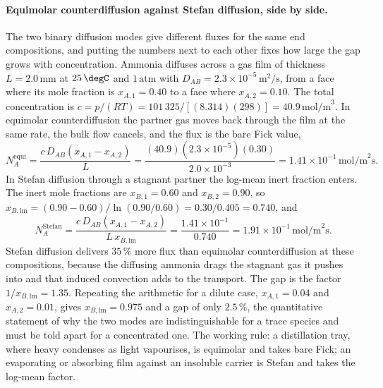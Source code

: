 \paragraph{Equimolar counterdiffusion against Stefan diffusion, side by
side.} The two binary diffusion modes give different fluxes for the same
end compositions, and putting the numbers next to each other fixes how
large the gap grows with concentration. Ammonia diffuses across a gas film
of thickness $L = 2.0\,\si{\milli\meter}$ at $25\,\degC$ and $1\,\text{atm}$
with $D_{AB} = 2.3\times 10^{-5}\,\si{\meter\squared\per\second}$, from a
face where its mole fraction is $x_{A,1} = 0.40$ to a face where
$x_{A,2} = 0.10$. The total concentration is $c = p/(RT) = 101\,325/
[(8.314)(298)] = 40.9\,\text{mol/m}^3$. In equimolar counterdiffusion the
partner gas moves back through the film at the same rate, the bulk flow
cancels, and the flux is the bare Fick value,
\[
N_A^{\text{equi}} = \frac{c\,D_{AB}(x_{A,1}-x_{A,2})}{L} =
\frac{(40.9)(2.3\times 10^{-5})(0.30)}{2.0\times 10^{-3}} =
1.41\times 10^{-1}\,\text{mol/m}^2\text{s}.
\]
In Stefan diffusion through a stagnant partner the log-mean inert fraction
enters. The inert mole fractions are $x_{B,1} = 0.60$ and $x_{B,2} = 0.90$,
so $x_{B,\text{lm}} = (0.90-0.60)/\ln(0.90/0.60) = 0.30/0.405 = 0.740$, and
\[
N_A^{\text{Stefan}} = \frac{c\,D_{AB}(x_{A,1}-x_{A,2})}{L\,x_{B,\text{lm}}}
= \frac{1.41\times 10^{-1}}{0.740} = 1.91\times 10^{-1}\,\text{mol/m}^2
\text{s}.
\]
Stefan diffusion delivers $35\,\%$ more flux than equimolar
counterdiffusion at these compositions, because the diffusing ammonia
drags the stagnant gas it pushes into and that induced convection adds to
the transport. The gap is the factor $1/x_{B,\text{lm}} = 1.35$. Repeating
the arithmetic for a dilute case, $x_{A,1} = 0.04$ and $x_{A,2} = 0.01$,
gives $x_{B,\text{lm}} = 0.975$ and a gap of only $2.5\,\%$, the
quantitative statement of why the two modes are indistinguishable for a
trace species and must be told apart for a concentrated one. The working
rule: a distillation tray, where heavy condenses as light vapourises, is
equimolar and takes bare Fick; an evaporating or absorbing film against an
insoluble carrier is Stefan and takes the log-mean factor.

